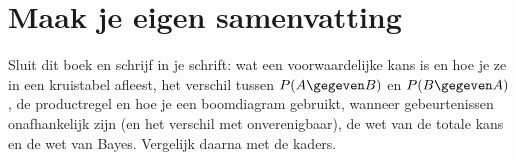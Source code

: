\begin{oefeningen}






\end{oefeningen}


\ifzelfstudie
\section*{Maak je eigen samenvatting}
Sluit dit boek en schrijf in je schrift: wat een voorwaardelijke kans is en hoe je ze in een kruistabel afleest, het verschil tussen $P(A \gegeven B)$ en $P(B \gegeven A)$, de productregel en hoe je een boomdiagram gebruikt, wanneer gebeurtenissen onafhankelijk zijn (en het verschil met onverenigbaar), de wet van de totale kans en de wet van Bayes. Vergelijk daarna met de kaders.
\fi
